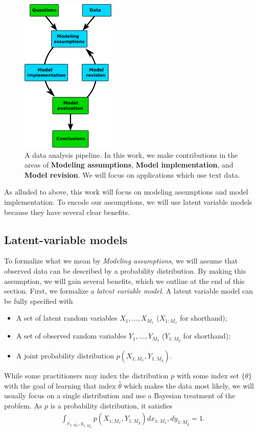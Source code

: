 \begin{figure}
  \center \includegraphics[width=0.4\textwidth]{chapter_introductory_material/figs/model_pipeline.pdf}
  \caption{A data analysis pipeline.  In this work, we make
    contributions in the areas of \textbf{Modeling assumptions},
    \textbf{Model implementation}, and \textbf{Model revision}.  We
    will focus on applications which use text data.}
  \label{fig:data_analysis_pipeline}
\end{figure}

As alluded to above, this work will focus on modeling assumptions and
model implementation.  To encode our assumptions, we will use latent
variable models because they have several clear benefits.

\subsection{Latent-variable models}

To formalize what we mean by \emph{Modeling assumptions}, we will
assume that observed data can be described by a probability
distribution.  By making this assumption, we will gain several
benefits, which we outline at the end of this section.  First, we
formalize a \emph{latent variable model}.  A latent variable model can
be fully specified with
\begin{itemize}
  \item A set of latent random variables $X_1, \ldots, X_{M_1}$ ($X_{1:M_x}$ for shorthand);
  \item A set of observed random variables $Y_1, \ldots, Y_{M_2}$ ($Y_{1:M_y}$ for shorthand);
  \item A joint probability distribution $p(X_{1:M_x}, Y_{1:M_y})$.
\end{itemize}
While some practitioners may index the distribution $p$ with some
index set $\{ \theta \}$ with the goal of learning that index $\hat
\theta$ which makes the data most likely, we will usually focus on a
single distribution and use a Bayesian treatment of the problem.  As
$p$ is a probability distribution, it satisfies
\begin{align*}
  \int_{x_{1:M_x}, y_{1:M_y}} p(X_{1:M_x}, Y_{1:M_y}) d x_{1:M_x}, d
  y_{1:M_y} = 1.
\end{align*}
  
